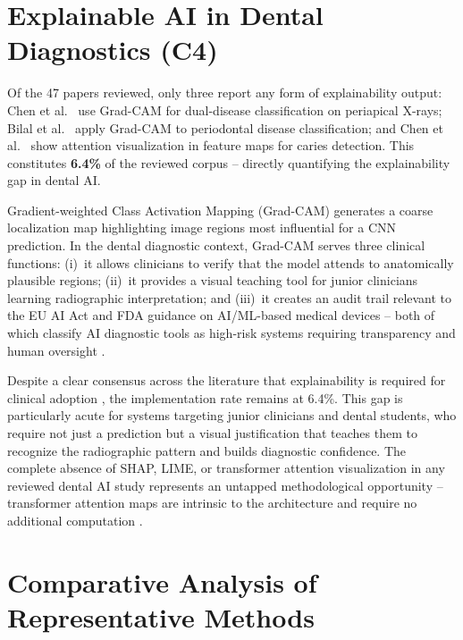 \documentclass[conference]{IEEEtran}
\begin{document}
\section{Explainable AI in Dental Diagnostics (C4)}
\label{sec:xai}

Of the 47 papers reviewed, only three report any form of explainability
output: Chen et al.~\cite{chen2023deep} use Grad-CAM for dual-disease
classification on periapical X-rays; Bilal et al.~\cite{bilal2024pdcnet}
apply Grad-CAM to periodontal disease classification; and Chen et
al.~\cite{chen2024cariesxrays} show attention visualization in feature
maps for caries detection. This constitutes \textbf{6.4\%} of the
reviewed corpus -- directly quantifying the explainability gap in dental
AI.

Gradient-weighted Class Activation Mapping (Grad-CAM) generates a
coarse localization map highlighting image regions most influential for a
CNN prediction. In the dental diagnostic context, Grad-CAM serves three
clinical functions: (i)~it allows clinicians to verify that the model
attends to anatomically plausible regions; (ii)~it provides a visual
teaching tool for junior clinicians learning radiographic interpretation;
and (iii)~it creates an audit trail relevant to the EU AI Act and FDA
guidance on AI/ML-based medical devices -- both of which classify AI
diagnostic tools as high-risk systems requiring transparency and human
oversight \cite{chen2023deep}.

Despite a clear consensus across the literature that explainability is
required for clinical adoption
\cite{nassiri2025yolo,gamal2025automated,sastika2025ai,ferrara2025applications},
the implementation rate remains at 6.4\%. This gap is particularly acute
for systems targeting junior clinicians and dental students, who require
not just a prediction but a visual justification that teaches them to
recognize the radiographic pattern and builds diagnostic confidence. The
complete absence of SHAP, LIME, or transformer attention visualization in
any reviewed dental AI study represents an untapped methodological
opportunity -- transformer attention maps are intrinsic to the
architecture and require no additional computation
\cite{bhoopalan2026self}.



\section{Comparative Analysis of Representative Methods}
\label{sec:comparison}
\end{document}

